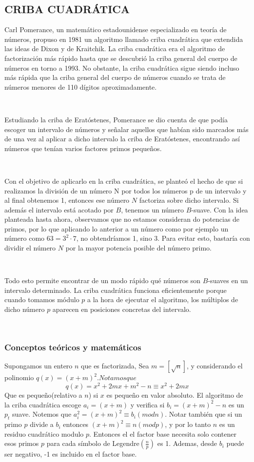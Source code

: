 \documentclass[11pt, conference]{IEEEtran}
\begin{document}
\subsection[Criba cuadrática]{\textbf{CRIBA CUADRÁTICA}}
Carl Pomerance, un matemático estadounidense especializado en teoría de números, propuso en 1981 un algoritmo llamado criba cuadrática que extendida las ideas de Dixon y de Kraitchik. La criba cuadrática era el algoritmo de factorización más rápido hasta que se descubrió la criba general del cuerpo de números en torno a 1993. No obstante, la criba cuadrática sigue siendo incluso más rápida que la criba general del cuerpo de números cuando se trata de números menores de 110 dígitos aproximadamente.\cite{b}
\cite{c}\cite{d}

\

Estudiando la criba de Eratóstenes, Pomerance se dio cuenta de que podía escoger un intervalo de números y señalar aquellos que habían sido marcados más de una vez al aplicar a dicho intervalo la criba de Eratóstenes, encontrando así números que tenían varios factores primos pequeños.

\

Con el objetivo de aplicarlo en la criba cuadrática, se planteó el hecho de que si realizamos la división de un número N por todos los números p de un intervalo y al final obtenemos 1, entonces ese número $N$ factoriza sobre dicho intervalo. Si además el intervalo está acotado por $B$, tenemos un número $B$-suave.
Con la idea planteada hasta ahora, observamos que no estamos consideran do potencias de primos, por lo que aplicando lo anterior a un número como por ejemplo un número como $63 = 3^2 \cdot 7$, no obtendríamos 1, sino 3. Para evitar esto, bastaría con dividir el número $N$ por la mayor potencia posible del número primo.

\

Todo esto permite encontrar de un modo rápido qué números son $B$-suaves en un intervalo determinado. La criba cuadrática funciona eficientemente porque cuando tomamos módulo $p$ a la hora de ejecutar el algoritmo, los múltiplos de dicho número $p$ aparecen en posiciones concretas del intervalo.

\

\subsubsection[Conceptos teóricos y matemáticos]{\textbf{Conceptos teóricos y matemáticos}}
Supongamos un entero $n$ que es factorizada, Sea $m=[\sqrt{n}]$, y considerando el polinomio $q(x) = (x+m)^2. Notamos que $
\[q(x) = x^2+2mx+m^2-n \equiv x^2+2mx\]
Que es pequeño(relativo a $n$) si $x$ es pequeño en valor absoluto. El algoritmo de la criba cuadrática escoge $a_i = (x+m)$ y verifica si $b_i = (x+m)^2-n$ es un $p_t$ suave. Notemos que $a^{2}_{i} = (x+m)^{2}\equiv b_i (mod n)$. Notar también que si un primo $p$ divide a $b_{i}$ entonces $(x+m)^2 \equiv n (mod p)$, y por lo tanto $n$ es un residuo cuadrático modulo $p$. Entonces el el factor base necesita solo contener esos primos $p$ para cada símbolo de Legendre$(\frac{n}{p})$ es 1. Ademas, desde $b_i$ puede ser negativo, -1 es incluido en el factor base. 
\end{document}

